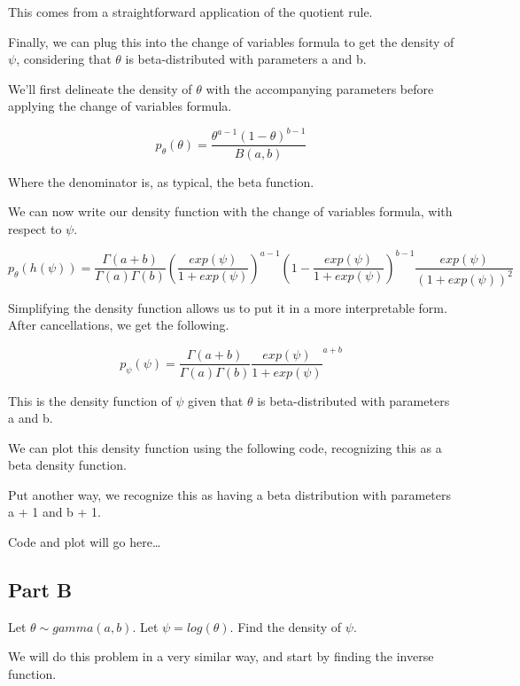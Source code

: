 \documentclass[12pt, letterpaper]{article}
\begin{document}
This comes from a straightforward application of the quotient rule. 

Finally, we can plug this into the change of variables formula to get the density of $\psi$, considering that $\theta$ is beta-distributed with parameters a and b. 

We'll first delineate the density of $\theta$ with the accompanying parameters before applying the change of variables formula. 

\begin{equation}
p_{\theta}(\theta) = \frac{\theta^{a-1}(1-\theta)^{b-1}}{B(a,b)} 
\end{equation} 

Where the denominator is, as typical, the beta function. 

We can now write our density function with the change of variables formula, with respect to $\psi$. 

\begin{equation}
  p_{\theta}(h(\psi)) = \frac{\Gamma(a+b)}{\Gamma(a)\Gamma(b)}\left(\frac{exp(\psi)}{1 + exp(\psi)}\right)^{a-1}\left(1 - \frac{exp(\psi)}{1 + exp(\psi)}\right)^{b-1}\frac{exp(\psi)}{(1+exp(\psi))^2}
\end{equation}

Simplifying the density function allows us to put it in a more interpretable form. After cancellations, we get the following. 

\begin{equation} 
p_{\psi}(\psi) = \frac{\Gamma(a+b)}{\Gamma(a)\Gamma(b)}\frac{exp(\psi)}{1 + exp(\psi)}^{a + b}
\end{equation}

This is the density function of $\psi$ given that $\theta$ is beta-distributed with parameters a and b. 

We can plot this density function using the following code, recognizing this as a beta density function. 

Put another way, we recognize this as having a beta distribution with parameters a + 1 and b + 1. 

Code and plot will go here\dots 

\subsection{Part B} 

Let $\theta \sim gamma(a,b)$. Let $\psi = log(\theta)$. Find the density of $\psi$. 

We will do this problem in a very similar way, and start by finding the inverse function. 
\end{document}
